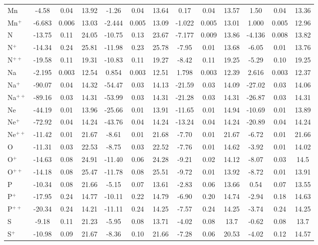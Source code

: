 \begin{longtable}{l!{\vrule width 0.25pt}ccc!{\vrule width 0.25pt}ccc!{\vrule width 0.25pt}ccc!{\vrule width 0.25pt}ccc}
Mn & -4.58 & 0.04 & 13.92 & -1.26 & 0.04 & 13.64 & 0.17 & 0.04 & 13.57 & 1.50 & 0.04 & 13.36 \\
Mn$^+$ & -6.683 & 0.006 & 13.03 & -2.444 & 0.005 & 13.09 & -1.022 & 0.005 & 13.01 & 1.000 & 0.005 & 12.96 \\
N & -13.75 & 0.11 & 24.05 & -10.75 & 0.13 & 23.67 & -7.177 & 0.009 & 13.86 & -4.136 & 0.008 & 13.82 \\
N$^+$ & -14.34 & 0.24 & 25.81 & -11.98 & 0.23 & 25.78 & -7.95 & 0.01 & 13.68 & -6.05 & 0.01 & 13.76 \\
N$^{++}$ & -19.58 & 0.11 & 19.31 & -10.83 & 0.11 & 19.27 & -8.42 & 0.11 & 19.25 & -5.29 & 0.10 & 19.25 \\
Na & -2.195 & 0.003 & 12.54 & 0.854 & 0.003 & 12.51 & 1.798 & 0.003 & 12.39 & 2.616 & 0.003 & 12.37 \\
Na$^+$ & -90.07 & 0.04 & 14.32 & -54.47 & 0.03 & 14.13 & -21.59 & 0.03 & 14.09 & -27.02 & 0.03 & 14.06 \\
Na$^{++}$ & -89.16 & 0.03 & 14.31 & -53.99 & 0.03 & 14.31 & -21.28 & 0.03 & 14.31 & -26.87 & 0.03 & 14.31 \\
Ne & -44.19 & 0.01 & 13.96 & -25.66 & 0.01 & 13.91 & -11.65 & 0.01 & 14.94 & -10.69 & 0.01 & 13.89 \\
Ne$^+$ & -72.92 & 0.04 & 14.24 & -43.76 & 0.04 & 14.24 & -13.24 & 0.04 & 14.24 & -20.89 & 0.04 & 14.24 \\
Ne$^{++}$ & -11.42 & 0.01 & 21.67 & -8.61 & 0.01 & 21.68 & -7.70 & 0.01 & 21.67 & -6.72 & 0.01 & 21.66 \\
O & -11.31 & 0.03 & 22.53 & -8.75 & 0.03 & 22.52 & -7.76 & 0.01 & 14.62 & -3.92 & 0.01 & 14.02 \\
O$^+$ & -14.63 & 0.08 & 24.91 & -11.40 & 0.06 & 24.28 & -9.21 & 0.02 & 14.12 & -8.07 & 0.03 & 14.5 \\
O$^{++}$ & -14.18 & 0.08 & 25.47 & -11.78 & 0.08 & 25.51 & -9.72 & 0.01 & 13.92 & -8.72 & 0.01 & 13.91 \\
P & -10.34 & 0.08 & 21.66 & -5.15 & 0.07 & 13.61 & -2.83 & 0.06 & 13.66 & 0.54 & 0.07 & 13.55 \\
P$^+$ & -17.95 & 0.24 & 14.77 & -10.11 & 0.22 & 14.79 & -6.90 & 0.20 & 14.74 & -2.94 & 0.18 & 14.63 \\
P$^{++}$ & -20.34 & 0.24 & 14.21 & -11.11 & 0.24 & 14.25 & -7.57 & 0.24 & 14.25 & -3.74 & 0.24 & 14.25 \\
S & -9.18 & 0.11 & 21.23 & -5.95 & 0.08 & 13.71 & -4.02 & 0.08 & 13.7 & -0.62 & 0.08 & 13.7 \\
S$^+$ & -10.98 & 0.09 & 21.67 & -8.36 & 0.10 & 21.66 & -7.28 & 0.06 & 20.53 & -4.02 & 0.12 & 14.57 \\

\end{longtable}
